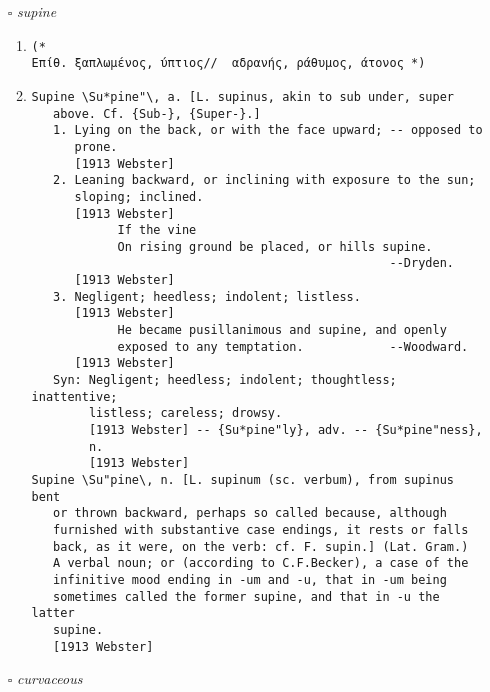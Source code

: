 \documentclass{article}
\begin{document}
\begin{itemize}
\begin{enumerate}
{\begin{lstlisting}
(* 
Επίθ. ερμηνευτικός (για τα άγια κείμενα) *)
\end{lstlisting}}
\item{
\begin{lstlisting}
Hermeneutic \Her`me*neu"tic\, Hermeneutical \Her`me*neu"tic*al\,
   a. [Gr. ?, fr. ? to interpret: cf. F. herm['e]neutique.]
   Unfolding the signification; of or pertaining to
   interpretation; exegetical; explanatory; as, hermeneutic
   theology, or the art of expounding the Scriptures; a
   hermeneutic phrase.
   [1913 Webster]
\end{lstlisting}}
\end{enumerate}
\item[$\square$] \emph{ supine }
\begin{enumerate}
\item{
\begin{lstlisting}
(* 
Επίθ. ξαπλωμένος, ύπτιος//  αδρανής, ράθυμος, άτονος *)
\end{lstlisting}}
\item{
\begin{lstlisting}
Supine \Su*pine"\, a. [L. supinus, akin to sub under, super
   above. Cf. {Sub-}, {Super-}.]
   1. Lying on the back, or with the face upward; -- opposed to
      prone.
      [1913 Webster]
   2. Leaning backward, or inclining with exposure to the sun;
      sloping; inclined.
      [1913 Webster]
            If the vine
            On rising ground be placed, or hills supine.
                                                  --Dryden.
      [1913 Webster]
   3. Negligent; heedless; indolent; listless.
      [1913 Webster]
            He became pusillanimous and supine, and openly
            exposed to any temptation.            --Woodward.
      [1913 Webster]
   Syn: Negligent; heedless; indolent; thoughtless; inattentive;
        listless; careless; drowsy.
        [1913 Webster] -- {Su*pine"ly}, adv. -- {Su*pine"ness},
        n.
        [1913 Webster]
Supine \Su"pine\, n. [L. supinum (sc. verbum), from supinus bent
   or thrown backward, perhaps so called because, although
   furnished with substantive case endings, it rests or falls
   back, as it were, on the verb: cf. F. supin.] (Lat. Gram.)
   A verbal noun; or (according to C.F.Becker), a case of the
   infinitive mood ending in -um and -u, that in -um being
   sometimes called the former supine, and that in -u the latter
   supine.
   [1913 Webster]
\end{lstlisting}}
\end{enumerate}
\item[$\square$] \emph{ curvaceous }

\end{itemize}
\end{document}
